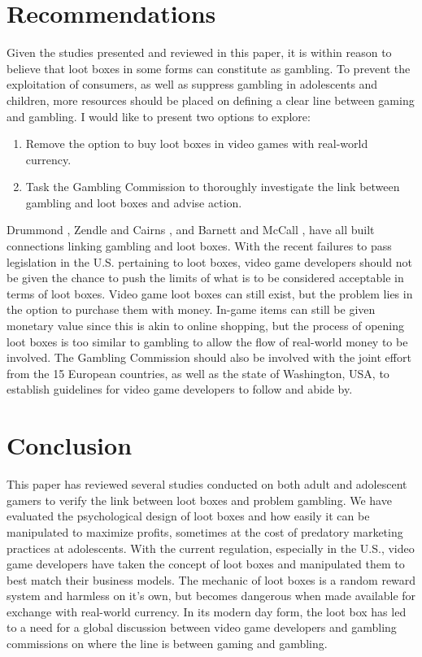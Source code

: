 \documentclass[11pt]{article}
\begin{document}
\section{Recommendations}\label{recommend-sect}
Given the studies presented and reviewed in this paper, it is within reason 
to believe that loot boxes in some forms can constitute as gambling. To 
prevent the exploitation of consumers, as well as suppress gambling
in adolescents and children, more resources should be placed on 
defining a clear line between gaming and gambling. I would like to
present two options to explore: 
\begin{enumerate}
   \item Remove the option to buy loot boxes in video games with
   real-world currency.
   \item Task the Gambling Commission to thoroughly investigate
   the link between gambling and loot boxes and advise action.
 \end{enumerate}
 Drummond \cite{Drummond2018},
Zendle and Cairns \cite{zd01}, and Barnett and McCall \cite{zmbc},
have all built connections linking gambling and loot boxes. With the recent 
failures to pass legislation in the U.S. pertaining to loot boxes, 
video game developers should not be given the chance to push the limits of 
what is to be considered acceptable in terms of loot boxes. 
Video game loot boxes can still exist, but the problem lies in the 
option to purchase them with money. In-game items can still be
given monetary value since this is akin to online shopping, but the
process of opening loot boxes is too similar to gambling to allow the
flow of real-world money to be involved.
The Gambling Commission should also be involved with the joint effort 
from the 15 European countries, as well as the state of Washington, USA,
to establish guidelines for video game developers to follow and abide by.



\section{Conclusion}\label{conclusion-sect}
This paper has reviewed several studies conducted on both adult and 
adolescent gamers to verify the link between loot boxes and 
problem gambling. We have evaluated the psychological design
of loot boxes and how easily it can be manipulated to maximize 
profits, sometimes at the cost of predatory marketing practices 
at adolescents. With the current regulation, especially in the U.S.,
video game developers have taken the concept of loot boxes 
and manipulated them to best match their business models. 
The mechanic of loot boxes is a random reward system
and harmless on it's own, but becomes dangerous when made
available for exchange with real-world currency. In its modern
day form, the loot box has led to a need for a global discussion
between video game developers and gambling commissions 
on where the line is between gaming and gambling.




\end{document}
